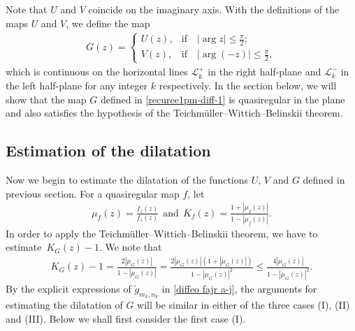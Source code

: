 \documentclass[12pt]{amsart}
\numberwithin{equation}{section}
\begin{document}
Note that $U$ and $V$ coincide on the imaginary axis. With the definitions of the maps $U$ and $V$, we define the map
\begin{equation}\label{recuree1pm-diff-1}
\begin{split}
G(z)=\left\{
       \begin{array}{ll}
         U(z),   &  \text{if} \quad |\arg z|\leq \frac{\pi}{2}; \\
         V(z),   &  \text{if} \quad |\arg(-z)|\leq \frac{\pi}{2},
       \end{array}
      \right.
\end{split}
\end{equation}
which is continuous on the horizontal lines $\mathcal{L}^{+}_k$ in the right half-plane and $\mathcal{L}^{-}_{k}$ in the left half-plane for any integer $k$ respectively. In the section below, we will show that the map $G$ defined in \eqref{recuree1pm-diff-1} is quasiregular in the plane and also satisfies the hypothesis of the Teichm\"uller--Wittich--Belinskii theorem.

\subsection{Estimation of the dilatation}\label{Estimation of the dilatation} %

Now we begin to estimate the dilatation of the functions $U$, $V$ and $G$ defined in previous section. For a quasiregular map $f$, let
\begin{equation*}%
\begin{split}
\mu_f(z)=\frac{f_{\overline{z}}(z)}{f_z(z)} \ \ \text{and} \ \ K_f(z)=\frac{1+|\mu_f(z)|}{1-|\mu_f(z)|}.
\end{split}
\end{equation*}
In order to apply the Teichm\"uller--Wittich--Belinskii theorem, we have to estimate~$K_G(z)-1$. We note that
\begin{equation*}%
\begin{split}
K_G(z)-1=\frac{2|\mu_G(z)|}{1-|\mu_G(z)|}=\frac{2|\mu_G(z)|(1+|\mu_G(z)|)}{1-|\mu_G(z)|^2}\leq \frac{4|\mu_G(z)|}{1-|\mu_G(z)|^2}.
\end{split}
\end{equation*}
By the explicit expressions of $\tilde{g}_{m_k,n_k}$ in \eqref{diffeo  fajr  a-j}, the arguments for estimating the dilatation of $G$ will be similar in either of the three cases (I), (II) and (III). Below we shall first consider the first case (I).
\end{document}
